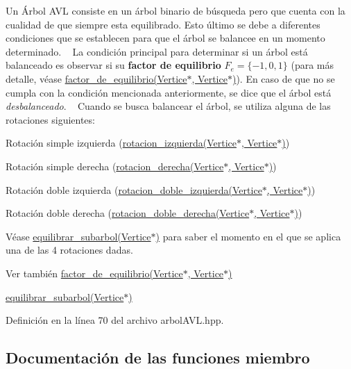 Un Árbol A\+VL consiste en un árbol binario de búsqueda pero que cuenta con la cualidad de que siempre esta equilibrado. Esto último se debe a diferentes condiciones que se establecen para que el árbol se balancee en un momento determinado. ~\newline
 La condición principal para determinar si un árbol está balanceado es observar si su {\bfseries factor de equilibrio} $F_e = \{-1,0,1\}$ (para más detalle, véase \hyperlink{classArbolAVL_a8cf229fd1482232fbfe4803043eeec14}{factor\+\_\+de\+\_\+equilibrio(\+Vertice$\ast$, Vertice$\ast$)}). En caso de que no se cumpla con la condición mencionada anteriormente, se dice que el árbol está {\itshape desbalanceado}. ~\newline
 Cuando se busca balancear el árbol, se utiliza alguna de las rotaciones siguientes\+:
\begin{DoxyItemize}
\item Rotación simple izquierda (\hyperlink{classArbolAVL_abfaf2247b607b040e328391ec8621546}{rotacion\+\_\+izquierda(\+Vertice$\ast$, Vertice$\ast$)})
\item Rotación simple derecha (\hyperlink{classArbolAVL_a33dfba0b6e53caa0f2e4b71a8d2c6a7e}{rotacion\+\_\+derecha(\+Vertice$\ast$, Vertice$\ast$)})
\item Rotación doble izquierda (\hyperlink{classArbolAVL_a3115c59bd2be761c530eeeb11a169700}{rotacion\+\_\+doble\+\_\+izquierda(\+Vertice$\ast$, Vertice$\ast$)})
\item Rotación doble derecha (\hyperlink{classArbolAVL_aa481f6a1014b68159b1fe753b96bde62}{rotacion\+\_\+doble\+\_\+derecha(\+Vertice$\ast$, Vertice$\ast$)})
\end{DoxyItemize}

Véase \hyperlink{classArbolAVL_ad24ffafb198dac21a98ff19e8361fbd6}{equilibrar\+\_\+subarbol(\+Vertice$\ast$)} para saber el momento en el que se aplica una de las 4 rotaciones dadas. \begin{DoxySeeAlso}{Ver también}
\hyperlink{classArbolAVL_a8cf229fd1482232fbfe4803043eeec14}{factor\+\_\+de\+\_\+equilibrio(\+Vertice$\ast$, Vertice$\ast$)} 

\hyperlink{classArbolAVL_ad24ffafb198dac21a98ff19e8361fbd6}{equilibrar\+\_\+subarbol(\+Vertice$\ast$)} 
\end{DoxySeeAlso}


Definición en la línea 70 del archivo arbol\+A\+V\+L.\+hpp.



\subsection{Documentación de las funciones miembro}
\mbox{\label{classArbolAVL_ac88b4af2e6b96775793a981baba0763a}} 
